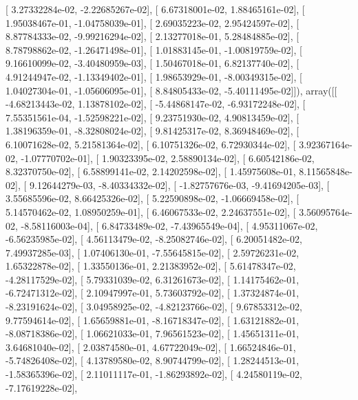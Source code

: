 \documentclass{article}
\begin{document}
       [  3.27332284e-02,  -2.22685267e-02],
       [  6.67318001e-02,   1.88465161e-02],
       [  1.95038467e-01,  -1.04758039e-01],
       [  2.69035223e-02,   2.95424597e-02],
       [  8.87784333e-02,  -9.99216294e-02],
       [  2.13277018e-01,   5.28484885e-02],
       [  8.78798862e-02,  -1.26471498e-01],
       [  1.01883145e-01,  -1.00819759e-02],
       [  9.16610099e-02,  -3.40480959e-03],
       [  1.50467018e-01,   6.82137740e-02],
       [  4.91244947e-02,  -1.13349402e-01],
       [  1.98653929e-01,  -8.00349315e-02],
       [  1.04027304e-01,  -1.05606095e-01],
       [  8.84805433e-02,  -5.40111495e-02]]), array([[ -4.68213443e-02,   1.13878102e-02],
       [ -5.44868147e-02,  -6.93172248e-02],
       [  7.55351561e-04,  -1.52598221e-02],
       [  9.23751930e-02,   4.90813459e-02],
       [  1.38196359e-01,  -8.32808024e-02],
       [  9.81425317e-02,   8.36948469e-02],
       [  6.10071628e-02,   5.21581364e-02],
       [  6.10751326e-02,   6.72930344e-02],
       [  3.92367164e-02,  -1.07770702e-01],
       [  1.90323395e-02,   2.58890134e-02],
       [  6.60542186e-02,   8.32370750e-02],
       [  6.58899141e-02,   2.14202598e-02],
       [  1.45975608e-01,   8.11565848e-02],
       [  9.12644279e-03,  -8.40334332e-02],
       [ -1.82757676e-03,  -9.41694205e-03],
       [  3.55685596e-02,   8.66425326e-02],
       [  5.22590898e-02,  -1.06669458e-02],
       [  5.14570462e-02,   1.08950259e-01],
       [  6.46067533e-02,   2.24637551e-02],
       [  3.56095764e-02,  -8.58116003e-04],
       [  6.84733489e-02,  -7.43965549e-04],
       [  4.95311067e-02,  -6.56235985e-02],
       [  4.56113479e-02,  -8.25082746e-02],
       [  6.20051482e-02,   7.49937285e-03],
       [  1.07406130e-01,  -7.55645815e-02],
       [  2.59726231e-02,   1.65322878e-02],
       [  1.33550136e-01,   2.21383952e-02],
       [  5.61478347e-02,  -4.28117529e-02],
       [  5.79331039e-02,   6.31261673e-02],
       [  1.14175462e-01,  -6.72471312e-02],
       [  2.10947997e-01,   5.73603792e-02],
       [  1.37324874e-01,  -8.23191624e-02],
       [  3.04958925e-02,  -4.82123766e-02],
       [  9.67853312e-02,   9.77594614e-02],
       [  1.65659881e-01,  -8.16718347e-02],
       [  1.63121882e-01,  -8.08718386e-02],
       [  1.06621033e-01,   7.96561523e-02],
       [  1.45651311e-01,   3.64681040e-02],
       [  2.03874580e-01,   4.67722049e-02],
       [  1.66524846e-01,  -5.74826408e-02],
       [  4.13789580e-02,   8.90744799e-02],
       [  1.28244513e-01,  -1.58365396e-02],
       [  2.11011117e-01,  -1.86293892e-02],
       [  4.24580119e-02,  -7.17619228e-02],
\end{document}
